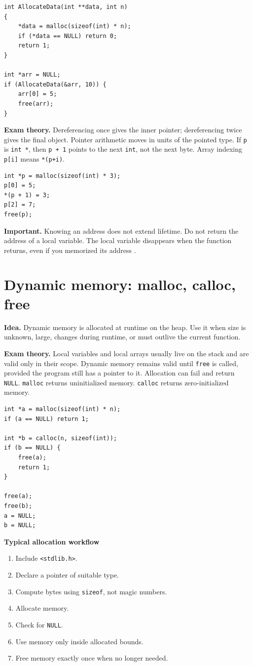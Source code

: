 \documentclass[10pt,a4paper]{article}
\newcommand{\idea}{\noindent\textbf{\textcolor{accentdark}{Idea.}} }
\newcommand{\theory}{\noindent\textbf{\textcolor{accentdark}{Exam theory.}} }
\newcommand{\important}[1]{\par\smallskip\noindent\colorbox{softyellow}{\parbox{\dimexpr\linewidth-2\fboxsep}{\textbf{\textcolor{accentdark}{Important.}} #1}}\par\smallskip}
\newcommand{\minihead}[1]{\par\smallskip\noindent\colorbox{softblue}{\parbox{\dimexpr\linewidth-2\fboxsep}{\textbf{#1}}}\par\smallskip}
\begin{document}
\begin{lstlisting}[caption={Allocation through double pointer}]
int AllocateData(int **data, int n)
{
    *data = malloc(sizeof(int) * n);
    if (*data == NULL) return 0;
    return 1;
}

int *arr = NULL;
if (AllocateData(&arr, 10)) {
    arr[0] = 5;
    free(arr);
}
\end{lstlisting}

\theory Dereferencing once gives the inner pointer; dereferencing twice gives the final object. Pointer arithmetic moves in units of the pointed type. If \texttt{p} is \texttt{int *}, then \texttt{p + 1} points to the next \texttt{int}, not the next byte. Array indexing \texttt{p[i]} means \texttt{*(p+i)}.

\begin{lstlisting}[caption={Pointer arithmetic and indexing}]
int *p = malloc(sizeof(int) * 3);
p[0] = 5;
*(p + 1) = 3;
p[2] = 7;
free(p);
\end{lstlisting}

\important{Knowing an address does not extend lifetime. Do not return the address of a local variable. The local variable disappears when the function returns, even if you memorized its address .}

\section{Dynamic memory: malloc, calloc, free}
\idea Dynamic memory is allocated at runtime on the heap. Use it when size is unknown, large, changes during runtime, or must outlive the current function.

\theory Local variables and local arrays usually live on the stack and are valid only in their scope. Dynamic memory remains valid until \texttt{free} is called, provided the program still has a pointer to it. Allocation can fail and return \texttt{NULL}. \texttt{malloc} returns uninitialized memory. \texttt{calloc} returns zero-initialized memory.

\begin{lstlisting}[caption={malloc, calloc, and free}]
int *a = malloc(sizeof(int) * n);
if (a == NULL) return 1;

int *b = calloc(n, sizeof(int));
if (b == NULL) {
    free(a);
    return 1;
}

free(a);
free(b);
a = NULL;
b = NULL;
\end{lstlisting}

\minihead{Typical allocation workflow}
\begin{enumerate}
\item Include \texttt{<stdlib.h>}.
\item Declare a pointer of suitable type.
\item Compute bytes using \texttt{sizeof}, not magic numbers.
\item Allocate memory.
\item Check for \texttt{NULL}.
\item Use memory only inside allocated bounds.
\item Free memory exactly once when no longer needed.
\end{enumerate}
\end{document}

